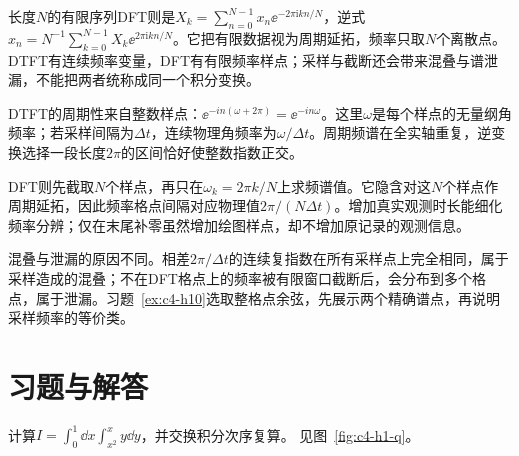 长度$N$的有限序列DFT则是$X_k=\sum_{n=0}^{N-1}x_n\ee^{-2\pi\mathrm ikn/N}$，逆式$x_n=N^{-1}\sum_{k=0}^{N-1}X_k\ee^{2\pi\mathrm ikn/N}$。它把有限数据视为周期延拓，频率只取$N$个离散点。DTFT有连续频率变量，DFT有有限频率样点；采样与截断还会带来混叠与谱泄漏，不能把两者统称成同一个积分变换。

DTFT的周期性来自整数样点：$\ee^{-in(\omega+2\pi)}=\ee^{-in\omega}$。这里$\omega$是每个样点的无量纲角频率；若采样间隔为$\Delta t$，连续物理角频率为$\omega/\Delta t$。周期频谱在全实轴重复，逆变换选择一段长度$2\pi$的区间恰好使整数指数正交。

DFT则先截取$N$个样点，再只在$\omega_k=2\pi k/N$上求频谱值。它隐含对这$N$个样点作周期延拓，因此频率格点间隔对应物理值$2\pi/(N\Delta t)$。增加真实观测时长能细化频率分辨；仅在末尾补零虽然增加绘图样点，却不增加原记录的观测信息。

混叠与泄漏的原因不同。相差$2\pi/\Delta t$的连续复指数在所有采样点上完全相同，属于采样造成的混叠；不在DFT格点上的频率被有限窗口截断后，会分布到多个格点，属于泄漏。习题~\ref{ex:c4-h10}选取整格点余弦，先展示两个精确谱点，再说明采样频率的等价类。




\section{习题与解答}

\begin{exercise}[换序后的抛物线区域]\label{ex:c4-h1}
计算$I=\int_0^1\dd x\int_{x^2}^{x}y\dd y$，并交换积分次序复算。 见图~\ref{fig:c4-h1-q}。
\end{exercise}


